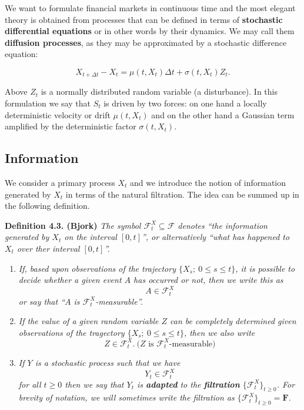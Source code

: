 \documentclass[a4paper,12pt,openany]{book}
\providecommand{\tightlist}{%
 \setlength{\itemsep}{0pt}\setlength{\parskip}{0pt}}
\begin{document}
We want to formulate financial markets in continuous time and the most elegant theory is obtained from processes that can be defined in terms of \textbf{stochastic differential equations} or in other words by their dynamics. We may call them \textbf{diffusion processes}, as they may be approximated by a stochastic difference equation:

\[
X_{t+\Delta t}-X_t=\mu(t,X_t)\Delta t+\sigma(t,X_t)Z_t.\tag{4.1}
\]

Above \(Z_t\) is a normally distributed random variable (a disturbance). In this formulation we say that \(S_t\) is driven by two forces: on one hand a locally deterministic velocity or drift \(\mu(t,X_t)\) and on the other hand a Gaussian term amplified by the deterministic factor \(\sigma(t,X_t)\).

\hypertarget{information}{%
\subsection{Information}\label{information}}

We consider a primary process \(X_t\) and we introduce the notion of information generated by \(X_t\) in terms of the natural filtration. The idea can be summed up in the following definition.

\textbf{Definition 4.3. (Bjork)} \emph{The symbol \(\mathcal{F}^X_t\subseteq\mathcal{F}\) denotes ``the information generated by \(X_t\) on the interval \([0,t]\)'', or alternatively ``what has happened to \(X_t\) over ther interval \([0,t]\)''.}

\begin{enumerate}
\def\labelenumi{\arabic{enumi}.}
\tightlist
\item
  \emph{If, based upon observations of the trajectory \(\{X_s;\ 0\le s\le t\}\), it is possible to decide whether a given event \(A\) has occurred or not, then we write this as}
  \[
    A\in\mathcal{F}^X_t
    \]
  \emph{or say that ``\(A\) is \(\mathcal{F}^X_t\)-measurable''.}
\item
  \emph{If the value of a given random variable \(Z\) can be completely determined given observations of the tragectory \(\{X_s;\ 0\le s\le t\}\), then we also write}
  \[
    Z\in\mathcal{F}^X_t.\ \text{(}Z\text{ is }\mathcal{F}^X_t\text{-measurable)}
    \]
\item
  \emph{If \(Y\) is a stochastic process such that we have}
  \[
    Y_t\in\mathcal{F}^X_t
    \]
  \emph{for all \(t\ge0\) then we say that \(Y_t\) is \textbf{adapted} to the \textbf{filtration} \(\{\mathcal{F}^X_t\}_{t\ge 0}\). For brevity of notation, we will sometimes write the filtration as \(\{\mathcal{F}^X_t\}_{t\ge 0}=\mathbf{F}\).}
\end{enumerate}
\end{document}
